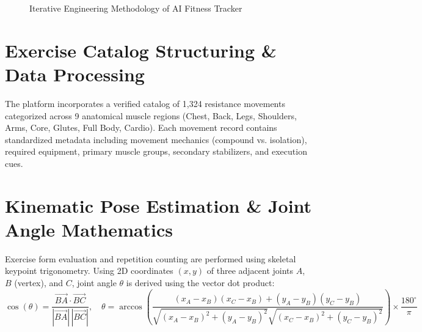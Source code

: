 \documentclass[12pt,a4paper]{report}
\begin{document}
\begin{figure}[htbp]
\centering
{}
\caption{Iterative Engineering Methodology of AI Fitness Tracker}
\label{fig:methodology}
\end{figure}

\section{Exercise Catalog Structuring \& Data Processing}
The platform incorporates a verified catalog of 1,324 resistance movements categorized across 9 anatomical muscle regions (Chest, Back, Legs, Shoulders, Arms, Core, Glutes, Full Body, Cardio). Each movement record contains standardized metadata including movement mechanics (compound vs. isolation), required equipment, primary muscle groups, secondary stabilizers, and execution cues.

\section{Kinematic Pose Estimation \& Joint Angle Mathematics}
Exercise form evaluation and repetition counting are performed using skeletal keypoint trigonometry. Using 2D coordinates $(x, y)$ of three adjacent joints $A$, $B$ (vertex), and $C$, joint angle $\theta$ is derived using the vector dot product:
\begin{equation}
\cos(\theta) = \frac{\vec{BA} \cdot \vec{BC}}{|\vec{BA}| \, |\vec{BC}|}, \quad \theta = \arccos\left(\frac{(x_A - x_B)(x_C - x_B) + (y_A - y_B)(y_C - y_B)}{\sqrt{(x_A - x_B)^2 + (y_A - y_B)^2} \sqrt{(x_C - x_B)^2 + (y_C - y_B)^2}}\right) \times \frac{180^\circ}{\pi}
\end{equation}
\end{document}
